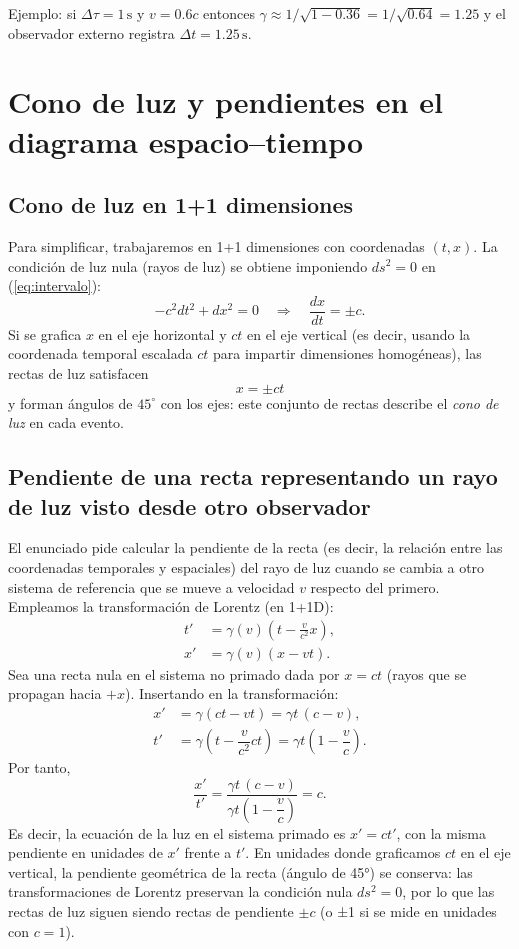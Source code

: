 \documentclass[12pt,oneside]{book}
\begin{document}
Ejemplo: si $\Delta\tau=1\,\mathrm{s}$ y $v=0.6c$ entonces $\gamma\approx 1/\sqrt{1-0.36}=1/\sqrt{0.64}=1.25$ y el observador externo registra $\Delta t=1.25\,\mathrm{s}$.

\chapter{Cono de luz y pendientes en el diagrama espacio--tiempo}
\section{Cono de luz en 1+1 dimensiones}
Para simplificar, trabajaremos en 1+1 dimensiones con coordenadas $(t,x)$. La condición de luz nula (rayos de luz) se obtiene imponiendo $ds^2=0$ en (\ref{eq:intervalo}):
\begin{equation}\label{eq:null_condition}
  -c^2 dt^2 + dx^2 = 0 \quad\Longrightarrow\quad \frac{dx}{dt}=\pm c.
\end{equation}
Si se grafica $x$ en el eje horizontal y $ct$ en el eje vertical (es decir, usando la coordenada temporal escalada $ct$ para impartir dimensiones homogéneas), las rectas de luz satisfacen
\begin{equation}
  x=\pm ct
\end{equation}
y forman ángulos de $45^{\circ}$ con los ejes: este conjunto de rectas describe el \emph{cono de luz} en cada evento.

\section{Pendiente de una recta representando un rayo de luz visto desde otro observador}
El enunciado pide calcular la pendiente de la recta (es decir, la relación entre las coordenadas temporales y espaciales) del rayo de luz cuando se cambia a otro sistema de referencia que se mueve a velocidad $v$ respecto del primero. Empleamos la transformación de Lorentz (en 1+1D):
\begin{align}
  t' &= \gamma(v)\left(t - \frac{v}{c^2}x\right),\\
  x' &= \gamma(v)\left(x - v t\right).
\end{align}
Sea una recta nula en el sistema no primado dada por $x= c t$ (rayos que se propagan hacia $+x$). Insertando en la transformación:
\begin{align*}
  x' &= \gamma\left(ct - vt\right) = \gamma t\,(c-v),\\
  t' &= \gamma\left(t - \dfrac{v}{c^2}ct\right) = \gamma t\left(1-\dfrac{v}{c}\right).
\end{align*}
Por tanto,
\begin{equation}
  \frac{x'}{t'} = \frac{\gamma t\,(c-v)}{\gamma t\left(1-\dfrac{v}{c}\right)} = c.
\end{equation}
Es decir, la ecuación de la luz en el sistema primado es $x' = c t'$, con la misma pendiente en unidades de $x'$ frente a $t'$. En unidades donde graficamos $ct$ en el eje vertical, la pendiente geométrica de la recta (ángulo de 45°) se conserva: las transformaciones de Lorentz preservan la condición nula $ds^2=0$, por lo que las rectas de luz siguen siendo rectas de pendiente $\pm c$ (o ±1 si se mide en unidades con $c=1$).
\end{document}
